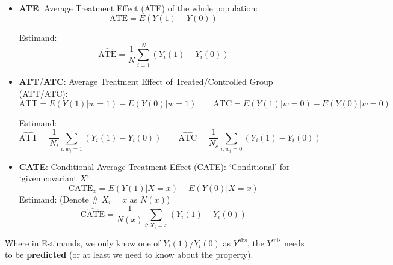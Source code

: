 \begin{itemize}[topsep=2pt,itemsep=0pt]
    \item \textbf{ATE}: Average Treatment Effect (ATE) of the whole population:
    \[
        \mathrm{ATE}=E(Y(1)-Y(0))  
    \]

    Estimand:
    \[
        \hat{\mathrm{ATE} }=\dfrac{1}{N}\sum_{i=1}^N(Y_i(1)-Y_i(0)) 
    \]

    \item \textbf{ATT}/\textbf{ATC}: Average Treatment Effect of Treated/Controlled Group (ATT/ATC):
    \[
        \mathrm{ATT}=E(Y(1)|w=1)-E(Y(0)|w=1)  \qquad \mathrm{ATC}=E(Y(1)|w=0)-E(Y(0)|w=0) 
    \]

    Estimand:
    \[
        \hat{\mathrm{ATT} }=\dfrac{1}{N_t}\sum_{i:w_i=1}(Y_i(1)-Y_i(0))\qquad \hat{\mathrm{ATC} }=\dfrac{1}{N_c}\sum_{i:w_i=0}(Y_i(1)-Y_i(0)) 
    \]
    
    
    \item \textbf{CATE}: Conditional Average Treatment Effect (CATE): `Conditional' for `given covariant $ X $'
    \[
        \mathrm{CATE}_x=E(Y(1)|X=x)-E(Y(0)|X=x)
    \]
    Estimand: (Denote \# $ X_i=x $ as $ N(x) $)
    \[
        \hat{\mathrm{CATE} }=\dfrac{1}{N(x)}\sum_{i:X_i=x}(Y_i(1)-Y_i(0)) 
    \]
    
    
\end{itemize}

    Where in Estimands, we only know one of $ Y_i(1)/Y_i(0) $ as $ Y^\mathrm{obs}  $, the $ Y^{\mathrm{mis} } $ needs to be \textbf{predicted} (or at least we need to know about the property).

    






